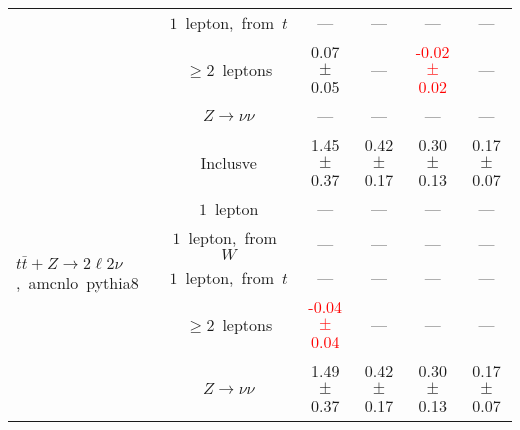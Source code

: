 \documentclass{article}
\begin{document}
\begin{longtable}{|l|c|c|c|c|c|}
 & $1$~lepton,~from~$t$  & ---  & ---  & ---  & --- \\* 
 & $\ge2$~leptons  & 0.07 $\pm$ 0.05  & ---  & \textcolor{red}{ -0.02 $\pm$ 0.02 }  & --- \\* 
 & $Z\rightarrow\nu\nu$  & ---  & ---  & ---  & --- \\* 
\hline 
\multirow{6}{*}{$t\bar{t}+Z{\rightarrow}2{\ell}2{\nu}$,~amcnlo~pythia8} & Inclusve  & 1.45 $\pm$ 0.37  & 0.42 $\pm$ 0.17  & 0.30 $\pm$ 0.13  & 0.17 $\pm$ 0.07 \\* 
 & $1$~lepton  & ---  & ---  & ---  & --- \\* 
 & $1$~lepton,~from~$W$  & ---  & ---  & ---  & --- \\* 
 & $1$~lepton,~from~$t$  & ---  & ---  & ---  & --- \\* 
 & $\ge2$~leptons  & \textcolor{red}{ -0.04 $\pm$ 0.04 }  & ---  & ---  & --- \\* 
 & $Z\rightarrow\nu\nu$  & 1.49 $\pm$ 0.37  & 0.42 $\pm$ 0.17  & 0.30 $\pm$ 0.13  & 0.17 $\pm$ 0.07 \\* 
\hline 
\end{longtable} 

 
 
 
 
\pagebreak 

 
 
 
 
\end{document}
